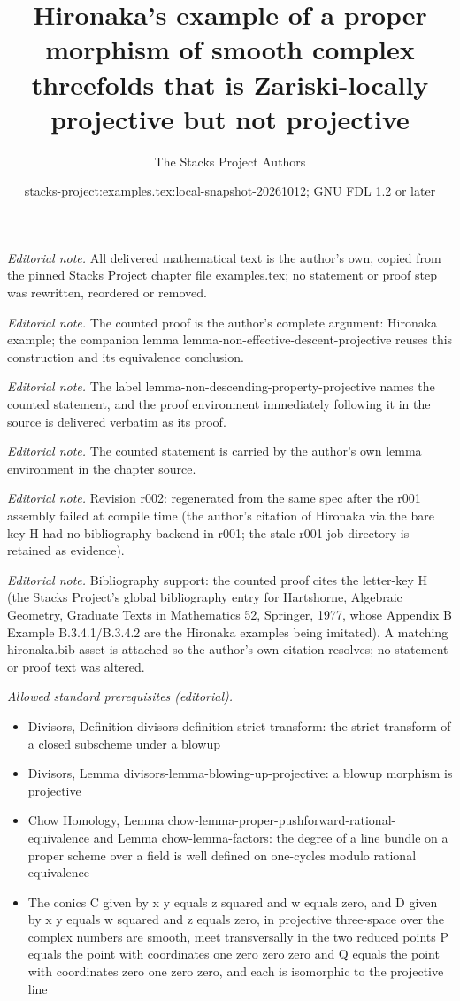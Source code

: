 \documentclass[10pt,a4paper]{amsart}
\title{Hironaka's example of a proper morphism of smooth complex threefolds that is Zariski-locally projective but not projective}
\author{The Stacks Project Authors}
\date{stacks-project:examples.tex:local-snapshot-20261012; GNU FDL 1.2 or later}
\theoremstyle{plain}
\theoremstyle{definition}
\theoremstyle{remark}
\numberwithin{equation}{subsection}
\begin{document}
\maketitle
\noindent\textit{Editorial note.} All delivered mathematical text is the author's own, copied from the pinned Stacks Project chapter file examples.tex; no statement or proof step was rewritten, reordered or removed.\par\medskip
\noindent\textit{Editorial note.} The counted proof is the author's complete argument: Hironaka example; the companion lemma lemma-non-effective-descent-projective reuses this construction and its equivalence conclusion.\par\medskip
\noindent\textit{Editorial note.} The label lemma-non-descending-property-projective names the counted statement, and the proof environment immediately following it in the source is delivered verbatim as its proof.\par\medskip
\noindent\textit{Editorial note.} The counted statement is carried by the author's own lemma environment in the chapter source.\par\medskip
\noindent\textit{Editorial note.} Revision r002: regenerated from the same spec after the r001 assembly failed at compile time (the author's citation of Hironaka via the bare key H had no bibliography backend in r001; the stale r001 job directory is retained as evidence).\par\medskip
\noindent\textit{Editorial note.} Bibliography support: the counted proof cites the letter-key H (the Stacks Project's global bibliography entry for Hartshorne, Algebraic Geometry, Graduate Texts in Mathematics 52, Springer, 1977, whose Appendix B Example B.3.4.1/B.3.4.2 are the Hironaka examples being imitated). A matching hironaka.bib asset is attached so the author's own citation resolves; no statement or proof text was altered.\par\medskip
\noindent\textit{Allowed standard prerequisites (editorial).}\begin{itemize}
\item Divisors, Definition divisors-definition-strict-transform: the strict transform of a closed subscheme under a blowup
\item Divisors, Lemma divisors-lemma-blowing-up-projective: a blowup morphism is projective
\item Chow Homology, Lemma chow-lemma-proper-pushforward-rational-equivalence and Lemma chow-lemma-factors: the degree of a line bundle on a proper scheme over a field is well defined on one-cycles modulo rational equivalence
\item The conics C given by x y equals z squared and w equals zero, and D given by x y equals w squared and z equals zero, in projective three-space over the complex numbers are smooth, meet transversally in the two reduced points P equals the point with coordinates one zero zero zero and Q equals the point with coordinates zero one zero zero, and each is isomorphic to the projective line
\end{itemize}\medskip
\end{document}
